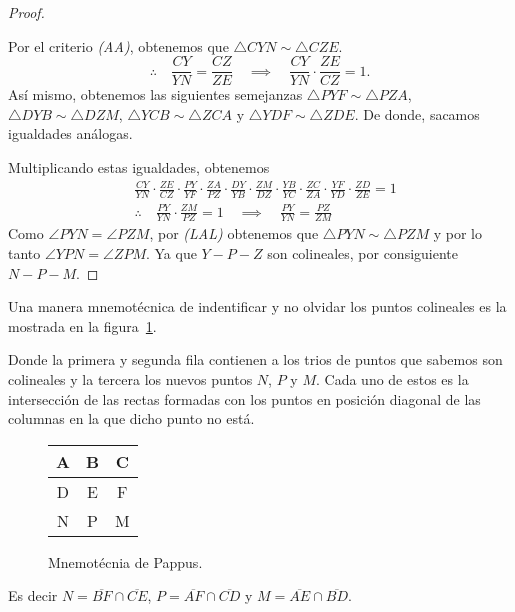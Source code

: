 \begin{proof}
    \begin{figure}[H]
        \centering
        
    \end{figure}

    Por el criterio \textit{(AA)}, obtenemos que $\triangle CYN \sim \triangle CZE$.
    \[
        \therefore  \quad \frac{CY}{YN} = \frac{CZ}{ZE} \quad \implies \quad \frac{CY}{YN} \cdot \frac{ZE}{CZ} = 1.
    \]
    Así mismo, obtenemos las siguientes semejanzas $\triangle PYF \sim \triangle PZA$, $\triangle DYB \sim \triangle DZM$, $\triangle YCB \sim \triangle ZCA$ y $\triangle YDF \sim \triangle ZDE$.
    De donde, sacamos igualdades análogas.

    Multiplicando estas igualdades, obtenemos
    \begin{align*}
        &\frac{CY}{YN} \cdot \frac{ZE}{CZ} \cdot \frac{PY}{YF} \cdot \frac{ZA}{PZ} \cdot \frac{DY}{YB} \cdot \frac{ZM}{DZ} \cdot \frac{YB}{YC} \cdot \frac{ZC}{ZA} \cdot \frac{YF}{YD} \cdot \frac{ZD}{ZE} = 1\\[3mm]
        &\therefore \quad \frac{PY}{YN} \cdot \frac{ZM}{PZ} = 1 \quad \implies \quad \frac{PY}{YN} = \frac{PZ}{ZM}
    \end{align*}
    Como $\angle PYN = \angle PZM$, por \textit{(LAL)} obtenemos que $\triangle PYN \sim \triangle PZM$ y por lo tanto $\angle YPN = \angle ZPM$.
    Ya que $Y - P - Z$ son colineales, por consiguiente $N - P - M$.
\end{proof}

\begin{remark.tcb}
    Una manera mnemotécnica de indentificar y no olvidar los puntos colineales es la mostrada en la figura~\ref{fig:pappus-mnemonic}.
    \begin{multicols}{2}
        Donde la primera y segunda fila contienen a los trios de puntos que sabemos son colineales y la tercera los nuevos puntos $N$, $P$ y $M$.
        Cada uno de estos es la intersección de las rectas formadas con los puntos en posición diagonal de las columnas en la que dicho punto no está.
        \begin{figure}[H]
            \centering
            \begin{tabular}{|c|c|c|}
                \hline
                A & B & C\\\hline
                D & E & F\\
                \hline \hline
                N & P & M\\
                \hline
            \end{tabular}
            \caption{Mnemotécnia de Pappus.}
            \label{fig:pappus-mnemonic}
        \end{figure}
        \vspace{-4mm}
        Es decir $N = \overline{BF} \cap \overline{CE}$, $P = \overline{AF} \cap \overline{CD}$ y $M = \overline{AE} \cap \overline{BD}$.
    \end{multicols}
\end{remark.tcb}



